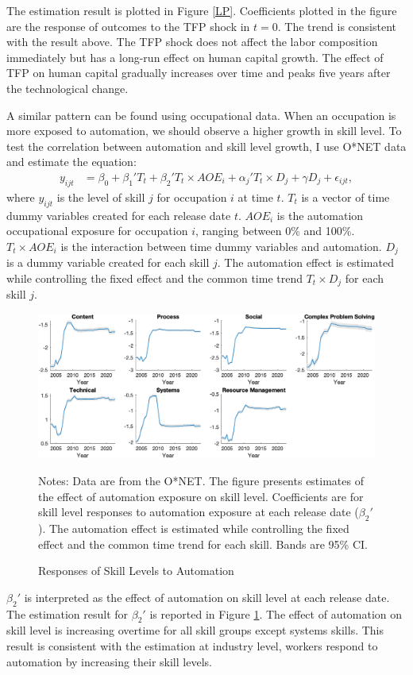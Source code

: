 \documentclass[12pt]{article}
\begin{document}
The estimation result is plotted in Figure \ref{LP}. Coefficients plotted in the figure are the response of outcomes to the TFP shock in $t = 0$. The trend is consistent with the result above. The TFP shock does not affect the labor composition immediately but has a long-run effect on human capital growth. The effect of TFP on human capital gradually increases over time and peaks five years after the technological change. 

A similar pattern can be found using occupational data. When an occupation is more exposed to automation, we should observe a higher growth in skill level. To test the correlation between automation and skill level growth, I use O*NET data and estimate the equation:
\begin{align}
y_{ijt} &= \beta_0 + \beta_1' T_t +\beta_2' T_t \times AOE_{i}+\alpha_j' T_t \times D_j +\gamma D_j+ \epsilon_{ijt},
\end{align}
where $y_{ijt}$ is the level of skill $j$ for occupation $i$ at time $t$. $T_t$ is a vector of time dummy variables created for each release date $t$. $AOE_{i}$ is the automation occupational exposure for occupation $i$, ranging between 0\% and 100\%. $T_t \times AOE_{i}$ is the interaction between time dummy variables and automation. $D_j$ is a dummy variable created for each skill $j$. The automation effect is estimated while controlling the fixed effect and the common time trend $T_t \times D_j$ for each skill $j$. 

\begin{figure}[h!]
\includegraphics[width = \textwidth]{LV}
\caption{Responses of Skill Levels to Automation}
\label{LV}
{\scriptsize Notes: Data are from the O*NET. The figure presents estimates of the effect of automation exposure on skill level. Coefficients are for skill level responses to automation exposure at each release date ($\beta_2'$). The automation effect is estimated while controlling the fixed effect and the common time trend for each skill. Bands are 95\% CI.}
\end{figure}
$\beta_2'$ is interpreted as the effect of automation on skill level at each release date. The estimation result for $\beta_2'$ is reported in Figure \ref{LV}. The effect of automation on skill level is increasing overtime for all skill groups except systems skills. This result is consistent with the estimation at industry level, workers respond to automation by increasing their skill levels. 
\end{document}
